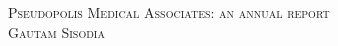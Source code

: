 \documentclass[11pt]{amsart}
\begin{document}
\begingroup
  \centering
  \LARGE \scshape{Pseudopolis Medical Associates: an annual report}\\[0.5em]
  \large Gautam Sisodia\par
\endgroup









\end{document}
